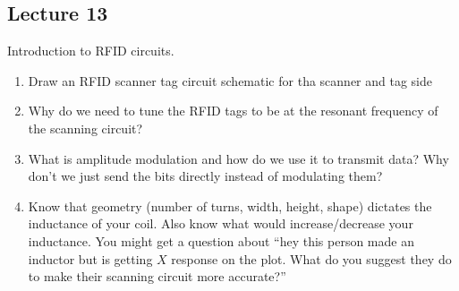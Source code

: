 \subsection*{Lecture 13}
Introduction to RFID circuits.
\begin{enumerate}
  \item Draw an RFID scanner tag circuit schematic for tha scanner and tag side
  \item Why do we need to tune the RFID tags to be at the resonant frequency of the scanning circuit?
  \item What is amplitude modulation and how do we use it to transmit data? 
  Why don't we just send the bits directly instead of modulating them?
  \item Know that geometry (number of turns, width, height, shape) dictates 
  the inductance of your coil. Also know what would increase/decrease your 
  inductance. You might get a question about ``hey this person made an 
  inductor but is getting $X$ response on the plot. 
  What do you suggest they do to make their scanning circuit more accurate?''
\end{enumerate}
